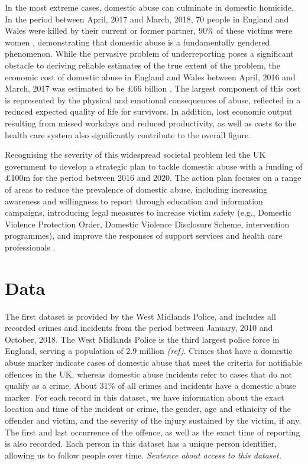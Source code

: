 \documentclass[12pt, letterpaper]{article}
\begin{document}
In the most extreme cases, domestic abuse can culminate in domestic homicide. In the period between April, 2017 and March, 2018, 70 people in England and Wales were killed by their current or former partner, 90\% of these victims were women \cite{homic}, demonstrating that domestic abuse is a fundamentally gendered phenomenon. While the pervasive problem of underreporting poses a significant obstacle to deriving reliable estimates of the true extent of the problem, the economic cost of domestic abuse in England and Wales between April, 2016 and March, 2017 was estimated to be \pounds 66 billion \cite{costs}. The largest component of this cost is represented by the physical and emotional consequences of abuse, reflected in a reduced expected quality of life for survivors. In addition, lost economic output resulting from missed workdays and reduced productivity, as well as costs to the health care system also significantly contribute to the overall figure. 


Recognising the severity of this widespread societal problem led the UK government to develop a strategic plan to tackle domestic abuse with a funding of £100m for the period between 2016 and 2020. The action plan focuses on a range of areas to reduce the prevalence of domestic abuse, including increasing awareness and willingness to report through education and information campaigns, introducing legal measures to increase victim safety (e.g., Domestic Violence Protection Order, Domestic Violence Disclosure Scheme, intervention programmes), and improve the responses of support services and health care professionals \cite{vawag}. 


\newpage


\section{Data}


The first dataset is provided by the West Midlands Police, and includes all recorded crimes and incidents from the period between January, 2010 and October, 2018. The West Midlands Police is the third largest police force in England, serving a population of 2.9 million \textit{(ref)}. Crimes that have a domestic abuse marker indicate cases of domestic abuse that meet the criteria for notifiable offences in the UK, whereas domestic abuse incidents refer to cases that do not qualify as a crime. About 31\% of all crimes and incidents have a domestic abuse marker. For each record in this dataset, we have information about the exact location and time of the incident or crime, the gender, age and ethnicity of the offender and victim, and the severity of the injury sustained by the victim, if any. The first and last occurrence of the offence, as well as the exact time of reporting is also recorded. Each person in this dataset has a unique person identifier, allowing us to follow people over time. \textit{Sentence about access to this dataset.}
\end{document}
